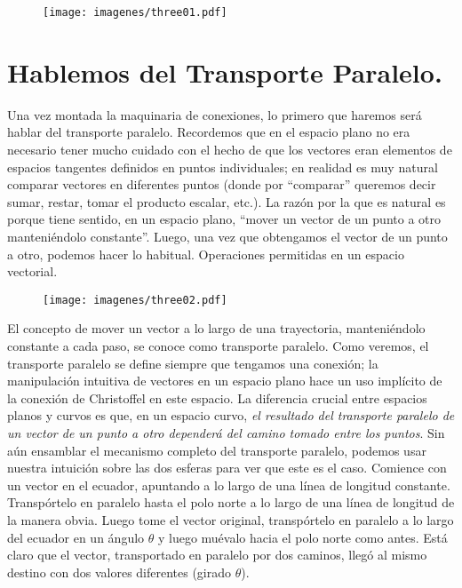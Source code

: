 \documentclass[11pt,b5paper,openany,twoside]{book}
\begin{document}
\begin{figure}[h]
\centering
\texttt{[image: imagenes/three01.pdf]}
\end{figure}

\section{Hablemos del Transporte Paralelo.}

Una vez montada la maquinaria de conexiones, lo primero que haremos será hablar del transporte paralelo.
Recordemos que en el espacio plano no era necesario tener mucho cuidado con el hecho de que los vectores eran elementos de espacios tangentes definidos en puntos individuales; en realidad es muy natural comparar vectores en diferentes puntos (donde por ``comparar'' queremos decir sumar, restar, tomar el producto escalar, etc.).
La razón por la que es natural es porque tiene sentido, en un espacio plano, ``mover un vector de un punto a otro manteniéndolo constante''. Luego, una vez que obtengamos el vector de un punto a otro, podemos hacer lo habitual. Operaciones permitidas en un espacio vectorial.

\begin{figure}[h]
\centering
\texttt{[image: imagenes/three02.pdf]}
\end{figure}

El concepto de mover un vector a lo largo de una trayectoria, manteniéndolo constante a cada paso, se conoce como transporte paralelo.
Como veremos, el transporte paralelo se define siempre que tengamos una conexión; la manipulación intuitiva de vectores en un espacio plano hace un uso implícito de la conexión de Christoffel en este espacio.
La diferencia crucial entre espacios planos y curvos es que, en un espacio curvo, \textit{el resultado del transporte paralelo de un vector de un punto a otro dependerá del camino tomado entre los puntos}.
Sin aún ensamblar el mecanismo completo del transporte paralelo, podemos usar nuestra intuición sobre las dos esferas para ver que este es el caso.
Comience con un vector en el ecuador, apuntando a lo largo de una línea de longitud constante.
Transpórtelo en paralelo hasta el polo norte a lo largo de una línea de longitud de la manera obvia.
Luego tome el vector original, transpórtelo en paralelo a lo largo del ecuador en un ángulo $\theta$ y luego muévalo hacia el polo norte como antes.
Está claro que el vector, transportado en paralelo por dos caminos, llegó al mismo destino con dos valores diferentes (girado $\theta$).
\end{document}
